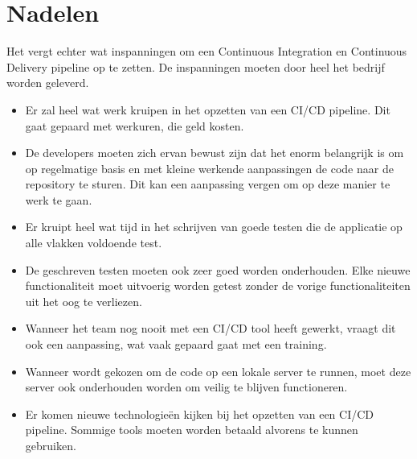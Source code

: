     \section{Nadelen}
    Het vergt echter wat inspanningen om een Continuous Integration en Continuous Delivery pipeline op te zetten. De inspanningen moeten door heel het bedrijf worden geleverd.
    \begin{itemize}
        \item Er zal heel wat werk kruipen in het opzetten van een CI/CD pipeline. Dit gaat gepaard met werkuren, die geld kosten.
        \item De developers moeten zich ervan bewust zijn dat het enorm belangrijk is om op regelmatige basis en met kleine werkende aanpassingen de code naar de repository te sturen. Dit kan een aanpassing vergen om op deze manier te werk te gaan.
        \item Er kruipt heel wat tijd in het schrijven van goede testen die de applicatie op alle vlakken voldoende test.
        \item De geschreven testen moeten ook zeer goed worden onderhouden. Elke nieuwe functionaliteit moet uitvoerig worden getest zonder de vorige functionaliteiten uit het oog te verliezen.
        \item Wanneer het team nog nooit met een CI/CD tool heeft gewerkt, vraagt dit ook een aanpassing, wat vaak gepaard gaat met een training.
        \item Wanneer wordt gekozen om de code op een lokale server te runnen, moet deze server ook onderhouden worden om veilig te blijven functioneren.
        \item Er komen nieuwe technologieën kijken bij het opzetten van een CI/CD pipeline. Sommige tools moeten worden betaald alvorens te kunnen gebruiken. 
    \end{itemize}